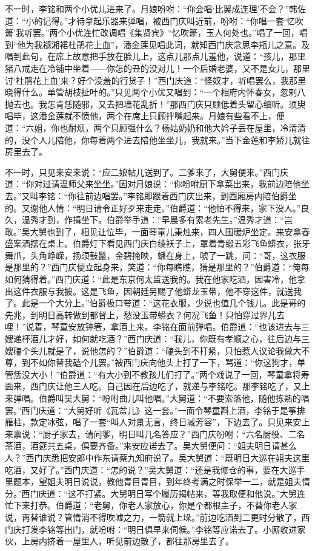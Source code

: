不一时，李铭和两个小优儿进来了。月娘吩咐：“你会唱‘比翼成连理’不会？”韩佐道：“小的记得。”才待拿起乐器来弹唱，被西门庆叫近前，吩咐：“你唱一套‘忆吹箫’我听罢。”两个小优连忙改调唱《集贤宾》“忆吹箫，玉人何处也。”唱了一回，唱到“他为我褪湘裙杜鹃花上血”，潘金莲见唱此词，就知西门庆念思李瓶儿之意。及唱到此句，在席上故意把手放在脸儿上，这点儿那点儿羞他，说道：“孩儿，那里猪八戒走在冷铺中坐着——你怎的丑的没对儿！一个后婚老婆，又不是女儿，那里讨‘杜鹃花上血’来？好个没羞的行货子！”西门庆道：“怪奴才，听唱罢么，我那里晓得什么。单管胡枝扯叶的。”只见两个小优又唱到：“一个相府内怀春女，忽剌八抛去也。我怎肯恁随邪，又去把墙花乱折！”那西门庆只顾低着头留心细听。须臾唱毕，这潘金莲就不愤他，两个在席上只顾拌嘴起来。月娘有些看不上，便道：“六姐，你也耐烦，两个只顾强什么？杨姑奶奶和他大妗子丢在屋里，冷清清的，没个人儿陪他，你每着两个进去陪他坐坐儿，我就来。”当下金莲和李娇儿就往房里去了。

不一时，只见来安来说：“应二娘帖儿送到了。二爹来了，大舅便来。”西门庆道：“你对过请温师父来坐坐。”因对月娘说：“你吩咐厨下拿菜出来，我前边陪他坐去。”又叫李铭：“你往前边唱罢。”李铭即跟着西门庆出来，到西厢房内陪伯爵坐的。又谢他人情：“明日请令正好歹来走走。”伯爵道：“他怕不得来，家下没人。”良久，温秀才到，作揖坐下。伯爵举手道：“早晨多有累老先生。”温秀才道：“岂敢。”吴大舅也到了，相见让位毕，一面琴童儿秉烛来，四人围暖炉坐定。来安拿春盛案酒摆在桌上。伯爵灯下看见西门庆白绫袄子上，罩着青缎五彩飞鱼蟒衣，张牙舞爪，头角峥嵘，扬须鼓鬣，金碧掩映，蟠在身上，唬了一跳，问：“哥，这衣服是那里的？”西门庆便立起身来，笑道：“你每瞧瞧，猜是那里的？”伯爵道：“俺每如何猜得着。”西门庆道：“此是东京何太监送我的。我在他家吃酒，因害冷，他拿出这件衣服与我披。这是飞鱼，因朝廷另赐了他蟒龙玉带，他不穿这件，就送我了。此是一个大分上。”伯爵极口夸道：“这花衣服，少说也值几个钱儿。此是哥的先兆，到明日高转做到都督上，愁没玉带蟒衣？何况飞鱼！只怕穿过界儿去哩！”说着，琴童安放钟箸，拿酒上来。李铭在面前弹唱。伯爵道：“也该进去与三嫂递杯酒儿才好，如何就吃酒？”西门庆道：“我儿，你既有孝顺之心，往后边与三嫂磕个头儿就是了，说他怎的？”伯爵道：“磕头到不打紧，只怕惹人议论我做大不尊，到不如你替我磕个儿罢。”被西门庆向他头上打了一下，骂道：“你这狗才，单管恁没大小！”伯爵道：“有大小到不教孩儿们打了。”两个戏说了一回，琴童拿将寿面来，西门庆让他三人吃。自己因在后边吃了，就递与李铭吃。那李铭吃了，又上来弹唱。伯爵叫吴大舅：“吩咐曲儿叫他唱。”大舅道：“不要索落他，随他拣熟的唱罢。”西门庆道：“大舅好听《瓦盆儿》这一套。”一面令琴童斟上酒，李铭于是筝排雁柱，款定冰弦，唱了一套“叫人对景无言，终日减芳容”，下边去了。只见来安上来禀说：“厨子家去，请问爹，明日叫几名答应？”西门庆吩咐：“六名厨役、二名茶酒，酒筵共五桌，俱要齐备。”来安应诺去了。吴大舅便问：“姐夫明日请甚么人？”西门庆悉把安郎中作东请蔡九知府说了。吴大舅道：“既明日大巡在姐夫这里吃酒，又好了。”西门庆道：“怎的说？”吴大舅道：“还是我修仓的事，要在大巡手里题本，望姐夫明日说说，教他青目青目，到年终考满之时保举一二，就是姐夫情分。”西门庆道：“这不打紧。大舅明日写个履历揭帖来，等我取便和他说。”大舅连忙下来打恭。伯爵道：“老舅，你老人家放心，你是个都根主子，不替你老人家说，再替谁说？管情消不得吹嘘之力，一箭就上垛。”前边吃酒到二更时分散了，西门庆打发李铭等出门，就吩咐：“明日俱早来伺候。”李铭等应诺去了。小厮收进家伙，上房内挤着一屋里人，听见前边散了，都往那房里去了。

